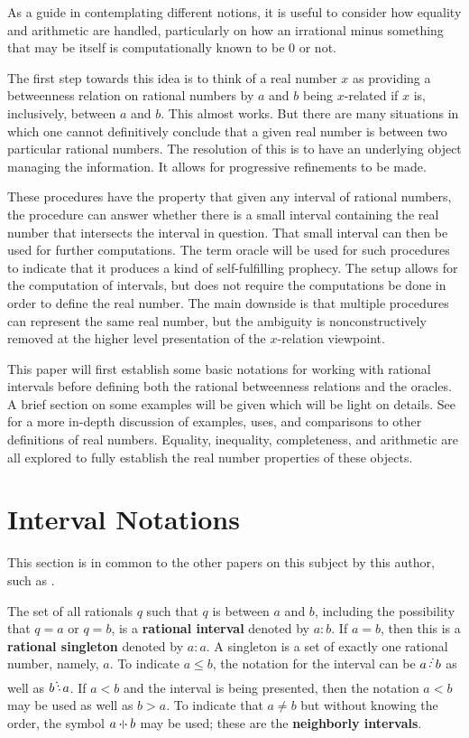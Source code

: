 \documentclass[12pt]{article}
\begin{document}
As a guide in contemplating different notions, it is useful to consider how equality and arithmetic are handled, particularly on how an irrational minus something that may be itself is computationally known to be 0 or not. 

The first step towards this idea is to think of a real number $x$ as providing a betweenness relation on rational numbers by $a$ and $b$ being $x$-related if $x$ is, inclusively, between $a$ and $b$. This almost works. But there are many situations in which one cannot definitively conclude that a given real number is between two particular rational numbers. The resolution of this is to have an underlying object managing the information. It allows for progressive refinements to be made. 

These procedures have the property that given any interval of rational numbers, the procedure can answer whether there is a small interval containing the real number that intersects the interval in question. That small interval can then be used for further computations. The term oracle will be used for such procedures to indicate that it produces a kind of self-fulfilling prophecy. The setup allows for the computation of intervals, but does not require the computations be done in order to define the real number. The main downside is that multiple procedures can represent the same real number, but the ambiguity is nonconstructively removed at the higher level presentation of the $x$-relation viewpoint.  

This paper will first establish some basic notations for working with rational intervals before defining both the rational betweenness relations and the oracles. A brief section on some examples will be given which will be light on details. See \cite{taylor23main} for a more in-depth discussion of examples, uses, and comparisons to other definitions of real numbers. Equality, inequality, completeness, and arithmetic are all explored to fully establish the real number properties of these objects. 

\section{Interval Notations}

This section is in common to the other papers on this subject by this author, such as \cite{taylor24dedekind}.

The set of all rationals $q$ such that $q$ is between $a$ and $b$, including the possibility that $q=a$ or $q=b$, is a \textbf{rational interval} denoted by $a:b$. If $a=b$, then this is a \textbf{rational singleton} denoted by $a:a$. A singleton is a set of exactly one rational number, namely, $a$. To indicate $a \leq b$, the notation for the interval can be $a \lte b$ as well as $b \gte a$. If $a < b$ and the interval is being presented, then the notation $a \lt b$ may be used as well as $b \gt a$. To indicate that $a \neq b$ but without knowing the order, the symbol $a \betneq b$ may be used; these are the \textbf{neighborly intervals}. 
\end{document}
